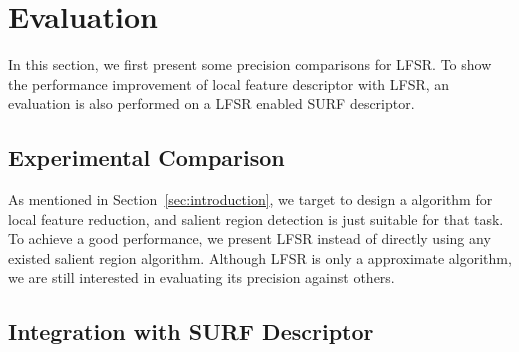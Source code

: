 \section{Evaluation}
\label{sec:evaluation}

In this section, we first present some precision comparisons for LFSR. To show the performance improvement of local feature descriptor with LFSR, an evaluation is also performed on a LFSR enabled SURF descriptor.

\subsection{Experimental Comparison}
\label{sec:evaluation_comparison}

As mentioned in Section~\ref{sec:introduction}, we target to design a algorithm for local feature reduction, and salient region detection is just suitable for that task. To achieve a good performance, we present LFSR instead of directly using any existed salient region algorithm. Although LFSR is only a approximate algorithm, we are still interested in evaluating its precision against others.

\subsection{Integration with SURF Descriptor}
\label{sec:observaion_integration}
